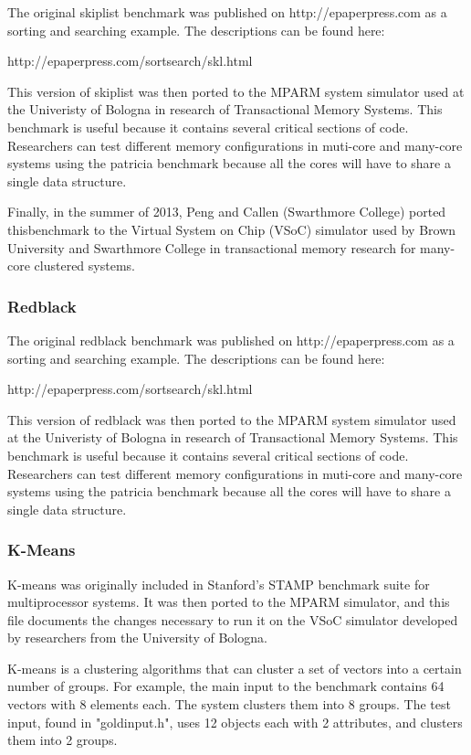 \documentclass{article}
\begin{document}
The original skiplist benchmark was published on http://epaperpress.com
as a sorting and searching example. The descriptions can be found here:

http://epaperpress.com/sortsearch/skl.html

This version of skiplist was then ported to the MPARM system simulator used at 
the Univeristy of Bologna in research of Transactional Memory Systems. This
benchmark is useful because it contains several critical sections of code. 
Researchers can test different memory configurations in muti-core and 
many-core systems using the patricia benchmark because all the cores will have 
to share a single data structure. 

Finally, in the summer of 2013, Peng and Callen (Swarthmore College) ported 
thisbenchmark to the Virtual System on Chip (VSoC) simulator used by Brown 
University and Swarthmore College in transactional memory research for 
many-core clustered systems. 

\subsubsection{Redblack}

The original redblack benchmark was published on http://epaperpress.com
as a sorting and searching example. The descriptions can be found here:

http://epaperpress.com/sortsearch/skl.html

This version of redblack was then ported to the MPARM system simulator used at 
the Univeristy of Bologna in research of Transactional Memory Systems. This
benchmark is useful because it contains several critical sections of code. 
Researchers can test different memory configurations in muti-core and many-core 
systems using the patricia benchmark because all the cores will have to share a 
single data structure. 


\subsubsection{K-Means}

K-means was originally included in Stanford's STAMP benchmark suite for 
multiprocessor systems.  It was then ported to the MPARM simulator, and this
file documents the changes necessary to run it on the VSoC simulator developed
by researchers from the University of Bologna. 

K-means is a clustering algorithms that can cluster a set of vectors into a 
certain number of groups.  For example, the main input to the benchmark
contains 64 vectors with 8 elements each. The system clusters them into 8
groups.  The test input, found in "goldinput.h", uses 12 objects each with 
2 attributes, and clusters them into 2 groups. 
\end{document}
